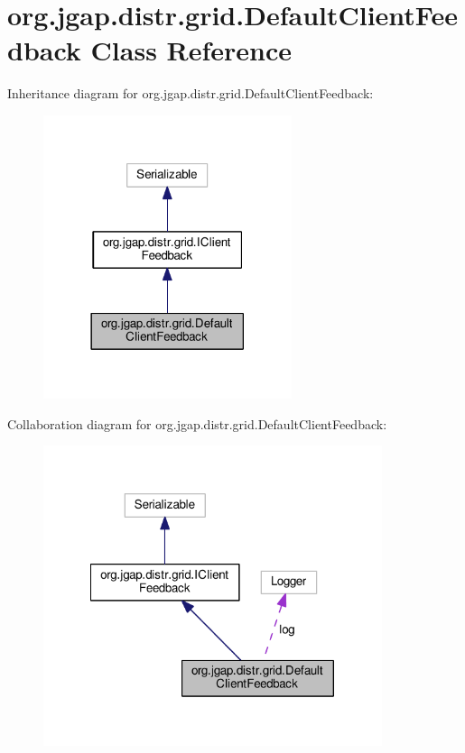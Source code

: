 \hypertarget{classorg_1_1jgap_1_1distr_1_1grid_1_1_default_client_feedback}{\section{org.\-jgap.\-distr.\-grid.\-Default\-Client\-Feedback Class Reference}
\label{classorg_1_1jgap_1_1distr_1_1grid_1_1_default_client_feedback}
}


Inheritance diagram for org.\-jgap.\-distr.\-grid.\-Default\-Client\-Feedback\-:
\nopagebreak
\begin{figure}[H]
\begin{center}
\leavevmode
\includegraphics[width=206pt]{classorg_1_1jgap_1_1distr_1_1grid_1_1_default_client_feedback__inherit__graph}
\end{center}
\end{figure}


Collaboration diagram for org.\-jgap.\-distr.\-grid.\-Default\-Client\-Feedback\-:
\nopagebreak
\begin{figure}[H]
\begin{center}
\leavevmode
\includegraphics[width=281pt]{classorg_1_1jgap_1_1distr_1_1grid_1_1_default_client_feedback__coll__graph}
\end{center}
\end{figure}
